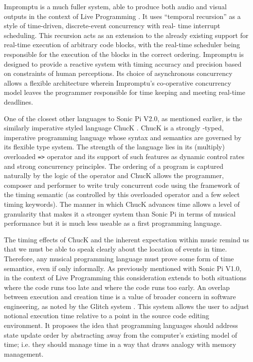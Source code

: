 \documentclass[11pt, abstracton, twoside]{scrartcl}
\begin{document}
Impromptu is a much fuller system, able to produce both audio and visual 
outputs in the context of Live Programming \cite{SG10}. It uses ``temporal 
recursion'' as a style of time-driven, discrete-event concurrency with real-
time interrupt scheduling. This recursion acts as an extension to the already 
existing support for real-time execution of arbitrary code blocks, with the 
real-time scheduler being responsible for the execution of the blocks in the 
correct ordering. Impromptu is designed to provide a reactive system with 
timing accuracy and precision based on constraints of human perceptions. Its 
choice of asynchronous concurrency allows a flexible architecture wherein 
Impromptu's co-operative concurrency model leaves the programmer responsible 
for time keeping and meeting real-time deadlines.

One of the closest other languages to Sonic Pi V2.0, as mentioned earlier, is 
the similarly imperative styled language ChucK \cite{WC03}. ChucK is a strongly
-typed, imperative programming language whose syntax and semantics are 
governed by its flexible type system. The strength of the language lies in its 
(multiply) overloaded \texttt{=>} operator and its support of such features as 
dynamic control rates and strong concurrency principles. The ordering of a 
program is captured naturally by the logic of the operator and ChucK allows 
the programmer, composer and performer to write truly concurrent code using 
the framework of the timing semantic (as controlled by this overloaded 
operator and a few select timing keywords). The manner in which ChucK advances 
time allows a level of granularity that makes it a stronger system than Sonic 
Pi in terms of musical performance but it is much less useable as a first 
programming language.

The timing effects of ChucK and the inherent expectation within music remind 
us that we must be able to speak clearly about the location of events in time. 
Therefore, any musical programming language must prove some form of time 
semantics, even if only informally. As previously mentioned with Sonic Pi 
V1.0, in the context of Live Programming this consideration extends to both 
situations where the code runs too late and where the code runs too early. An 
overlap between execution and creation time is a value of broader concern in 
software engineering, as noted by the Glitch system \cite{ME14}. This system 
allows the user to adjust notional execution time relative to a point in the 
source code editing environment. It proposes the idea that programming 
languages should address state update order by abstracting away from the 
computer's existing model of time; i.e. they should manage time in a way that 
draws analogy with memory management. 
\end{document}
